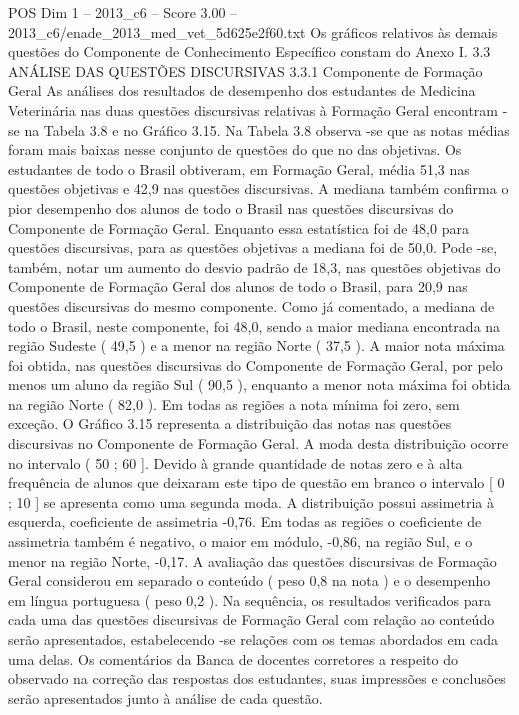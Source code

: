 \begin{textsample}{POS Dim 1 – 2013\_c6 – Score 3.00 – 2013\_c6/enade\_2013\_med\_vet\_5d625e2f60.txt}
Os gráficos relativos às demais questões do Componente de Conhecimento Específico constam do Anexo I. 3.3 ANÁLISE DAS QUESTÕES DISCURSIVAS 3.3.1 Componente de Formação Geral As análises dos resultados de desempenho dos estudantes de Medicina Veterinária nas duas questões discursivas relativas à Formação Geral encontram -se na Tabela 3.8 e no Gráfico 3.15.
Na Tabela 3.8 observa -se que as notas médias foram mais baixas nesse conjunto de questões do que no das objetivas.
Os estudantes de todo o Brasil obtiveram, em Formação Geral, média 51,3 nas questões objetivas e 42,9 nas questões discursivas.
A mediana também confirma o pior desempenho dos alunos de todo o Brasil nas questões discursivas do Componente de Formação Geral.
Enquanto essa estatística foi de 48,0 para questões discursivas, para as questões objetivas a mediana foi de 50,0.
Pode -se, também, notar um aumento do desvio padrão de 18,3, nas questões objetivas do Componente de Formação Geral dos alunos de todo o Brasil, para 20,9 nas questões discursivas do mesmo componente.
Como já comentado, a mediana de todo o Brasil, neste componente, foi 48,0, sendo a maior mediana encontrada na região Sudeste ( 49,5 ) e a menor na região Norte ( 37,5 ).
A maior nota máxima foi obtida, nas questões discursivas do Componente de Formação Geral, por pelo menos um aluno da região Sul ( 90,5 ), enquanto a menor nota máxima foi obtida na região Norte ( 82,0 ).
Em todas as regiões a nota mínima foi zero, sem exceção.
O Gráfico 3.15 representa a distribuição das notas nas questões discursivas no Componente de Formação Geral.
A moda desta distribuição ocorre no intervalo ( 50 ; 60 ].
Devido à grande quantidade de notas zero e à alta frequência de alunos que deixaram este tipo de questão em branco o intervalo [ 0 ; 10 ] se apresenta como uma segunda moda.
A distribuição possui assimetria à esquerda, coeficiente de assimetria -0,76.
Em todas as regiões o coeficiente de assimetria também é negativo, o maior em módulo, -0,86, na região Sul, e o menor na região Norte, -0,17.
A avaliação das questões discursivas de Formação Geral considerou em separado o conteúdo ( peso 0,8 na nota ) e o desempenho em língua portuguesa ( peso 0,2 ).
Na sequência, os resultados verificados para cada uma das questões discursivas de Formação Geral com relação ao conteúdo serão apresentados, estabelecendo -se relações com os temas abordados em cada uma delas.
Os comentários da Banca de docentes corretores a respeito do observado na correção das respostas dos estudantes, suas impressões e conclusões serão apresentados junto à análise de cada questão.

\end{textsample}
